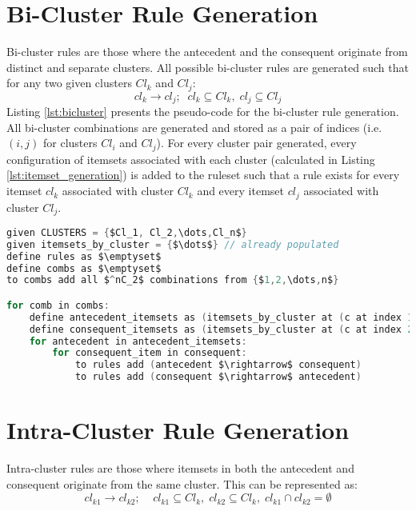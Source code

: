 \section{Bi-Cluster Rule Generation}
\label{sec:bicluster}
Bi-cluster rules are those where the antecedent and the consequent originate from distinct and separate clusters. All possible bi-cluster rules are generated such that for any two given clusters $Cl_k$ and $Cl_j$:
\[
cl_k \rightarrow cl_j;\;\; cl_k \subseteq Cl_k, \; cl_j \subseteq Cl_j
\]
Listing \ref{lst:bicluster} presents the pseudo-code for the bi-cluster rule generation. All bi-cluster combinations are generated and stored as a pair of indices (i.e. $(i,j)$ for clusters $Cl_i$ and $Cl_j$). For every cluster pair generated, every configuration of itemsets associated with each cluster (calculated in Listing \ref{lst:itemset_generation}) is added to the ruleset such that a rule exists for every itemset $cl_k$ associated with cluster $Cl_k$ and every itemset $cl_j$ associated with cluster $Cl_j$.

\begin{minipage}{\linewidth}
\begin{lstlisting}[language=C, mathescape=true, caption=Bi-Cluster Rule Generation, label=lst:bicluster]
given CLUSTERS = {$Cl_1, Cl_2,\dots,Cl_n$}
given itemsets_by_cluster = {$\dots$} // already populated
define rules as $\emptyset$
define combs as $\emptyset$
to combs add all $^nC_2$ combinations from {$1,2,\dots,n$}

for comb in combs:
    define antecedent_itemsets as (itemsets_by_cluster at (c at index 1)) // first index is 1
    define consequent_itemsets as (itemsets_by_cluster at (c at index 2))
    for antecedent in antecedent_itemsets:
        for consequent_item in consequent:
            to rules add (antecedent $\rightarrow$ consequent)
            to rules add (consequent $\rightarrow$ antecedent)
\end{lstlisting}
\end{minipage}

\section{Intra-Cluster Rule Generation}
\label{sec:intracluster}
Intra-cluster rules are those where itemsets in both the antecedent and consequent originate from the same cluster. This can be represented as:
\[
cl_{k1} \rightarrow cl_{k2}; \;\;\;\; cl_{k1} \subseteq Cl_k,\; cl_{k2} \subseteq Cl_k,\; cl_{k1} \cap cl_{k2} = \emptyset
\]

